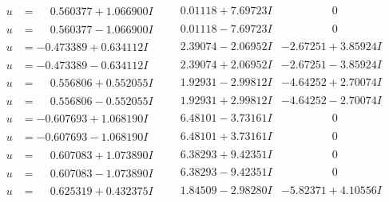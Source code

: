 \documentclass[1p]{elsarticle_modified}
\theoremstyle{definition}
\begin{document}
$$\begin{array}{c|c|c}
\begin{aligned}
u &= \phantom{-}0.560377 + 1.066900 I\end{aligned}
 & \phantom{-}0.01118 + 7.69723 I & \phantom{-0.000000 } 0 \\ \hline\begin{aligned}
u &= \phantom{-}0.560377 - 1.066900 I\end{aligned}
 & \phantom{-}0.01118 - 7.69723 I & \phantom{-0.000000 } 0 \\ \hline\begin{aligned}
u &= -0.473389 + 0.634112 I\end{aligned}
 & \phantom{-}2.39074 - 2.06952 I & -2.67251 + 3.85924 I \\ \hline\begin{aligned}
u &= -0.473389 - 0.634112 I\end{aligned}
 & \phantom{-}2.39074 + 2.06952 I & -2.67251 - 3.85924 I \\ \hline\begin{aligned}
u &= \phantom{-}0.556806 + 0.552055 I\end{aligned}
 & \phantom{-}1.92931 - 2.99812 I & -4.64252 + 2.70074 I \\ \hline\begin{aligned}
u &= \phantom{-}0.556806 - 0.552055 I\end{aligned}
 & \phantom{-}1.92931 + 2.99812 I & -4.64252 - 2.70074 I \\ \hline\begin{aligned}
u &= -0.607693 + 1.068190 I\end{aligned}
 & \phantom{-}6.48101 - 3.73161 I & \phantom{-0.000000 } 0 \\ \hline\begin{aligned}
u &= -0.607693 - 1.068190 I\end{aligned}
 & \phantom{-}6.48101 + 3.73161 I & \phantom{-0.000000 } 0 \\ \hline\begin{aligned}
u &= \phantom{-}0.607083 + 1.073890 I\end{aligned}
 & \phantom{-}6.38293 + 9.42351 I & \phantom{-0.000000 } 0 \\ \hline\begin{aligned}
u &= \phantom{-}0.607083 - 1.073890 I\end{aligned}
 & \phantom{-}6.38293 - 9.42351 I & \phantom{-0.000000 } 0 \\ \hline\begin{aligned}
u &= \phantom{-}0.625319 + 0.432375 I\end{aligned}
 & \phantom{-}1.84509 - 2.98280 I & -5.82371 + 4.10556 I \\ \hline\begin{aligned}

\end{aligned}
\end{array}$$
\end{document}
